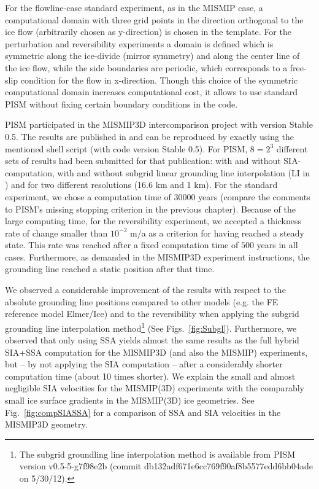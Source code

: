 For the flowline-case standard experiment, as in the MISMIP case, a computational domain with three grid points in the direction orthogonal to the ice flow (arbitrarily chosen as y-direction) is chosen in the template. For the perturbation and reversibility experiments a domain is defined which is symmetric along the ice-divide (mirror symmetry) and along the center line of the ice flow, while the side boundaries are periodic, which corresponds to a free-slip condition for the flow in x-direction. Though this choice of the symmetric computational domain increases computational cost, it allows to use standard PISM without fixing certain boundary conditions in the code.

PISM participated in the MISMIP3D intercomparison project with version Stable 0.5. The results are published in \cite{MISMIP3D2012} and can be reproduced by exactly using the mentioned shell script (with code version Stable 0.5). For PISM, $8=2^3$ different sets of results had been submitted for that publication: with and without SIA-computation, with and without subgrid linear grounding line interpolation (LI in \cite{Gladstoneetal2012}) and for two different resolutions (16.6 km and 1 km). For the standard experiment, we chose a computation time of $30000$ years (compare the comments to PISM's missing stopping criterion in the previous chapter). Because of the large computing time, for the reversibility experiment, we accepted a thickness rate of change smaller than $10^{−2}$ m/a as a criterion for having reached a steady state. This rate was reached after a fixed computation time of $500$ years in all cases. Furthermore, as demanded in the MISMIP3D experiment instructions, the grounding line reached a static position after that time.

We observed a considerable improvement of the results with respect to the absolute grounding line positions compared to other models (e.g. the FE reference model Elmer/Ice) and to the reversibility when applying the subgrid grounding line interpolation method\footnote{The subgrid groundling line interpolation method is available from PISM version v0.5-5-g7f98e2b (commit db132adf671e6cc769f90af8b5577edd6bb04ade on 5/30/12).} (See Figs.~\ref{fig:Subgl}). Furthermore, we observed that only using SSA yields almost the same results as the full hybrid SIA+SSA computation for the MISMIP3D (and also the MISMIP) experiments, but -- by not applying the SIA computation -- after a considerably shorter computation time (about 10 times shorter). We explain the small and almost negligible SIA velocities for the MISMIP(3D) experiments with the comparably small ice surface gradients in the MISMIP(3D) ice geometries. See Fig.~\ref{fig:compSIASSA} for a comparison of SSA and SIA velocities in the MISMIP3D geometry.

